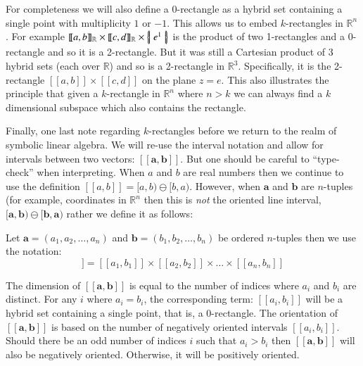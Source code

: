 For completeness we will also define a 0-rectangle as a hybrid set containing a single point with multiplicity $1$ or $-1$.
This allows us to embed $k$-rectangles in $\mathbb{R}^n$.
For example $[\![a,b]\!]_\mathbb{R} \times [\![c,d]\!]_\mathbb{R} \times \left\{ \! \left| \; e^1 \; \right| \! \right\}$ is the product of two 1-rectangles
and a 0-rectangle and so it is a 2-rectangle.
But it was still a Cartesian product of 3 hybrid sets (each over $\mathbb{R}$) and so is a 2-rectangle in $\mathbb{R}^3$.
Specifically, it is the 2-rectangle $[\![a,b]\!] \times [\![c,d]\!]$ on the plane $z=e$.
This also illustrates the principle that given a $k$-rectangle in $\mathbb{R}^n$ where $n>k$ we can always find a $k$ 
dimensional subspace which also contains the rectangle.


Finally, one last note regarding $k$-rectangles before we return to the realm of symbolic linear algebra.
We will re-use the interval notation and allow for intervals between two vectors: $[\![\boldsymbol{a}, \boldsymbol{b}]\!]$.
But one should be careful to ``type-check'' when interpreting.
When $a$ and $b$ are real numbers then we continue to use the definition $[\![a,b]\!] = [a,b) \ominus [b,a)$.
However, when $\boldsymbol{a}$ and $\boldsymbol{b}$ are $n$-tuples (for example, coordinates in $\mathbb{R}^n$ 
then this is \emph{not} the oriented line interval, 
$[\boldsymbol{a}, \boldsymbol{b}) \ominus [\boldsymbol{b}, \boldsymbol{a})$
rather we define it as follows:

\begin{definition}
	Let $\boldsymbol{a} = (a_1, a_2, \ldots, a_n)$ and 
	$\boldsymbol{b} = (b_1, b_2, \ldots, b_n)$ be ordered $n$-tuples then we use the notation:
	\begin{equation}
		[\![ \boldsymbol{a}, \boldsymbol{b} ]\!] 
		= [\![a_1, b_1]\!] \times [\![a_2, b_2 ]\!] \times \ldots \times [\![a_n , b_n]\!]
	\end{equation}
\end{definition}

The dimension of $[\![ \boldsymbol{a}, \boldsymbol{b} ]\!]$ is equal to the number of indices where $a_i$ and $b_i$ are distinct.
For any $i$ where $a_i = b_i$, the corresponding term: $[\![ a_i, b_i ]\!]$ will be a hybrid set containing a single point, that is, a 0-rectangle.
The orientation of $[\![ \boldsymbol{a}, \boldsymbol{b} ]\!]$ is based on the number of negatively oriented intervals $[\![a_i,b_i]\!]$.
Should there be an odd number of indices $i$ such that $a_i > b_i$ then $[\![ \boldsymbol{a}, \boldsymbol{b} ]\!]$ will also be negatively oriented.
Otherwise, it will be positively oriented. 


